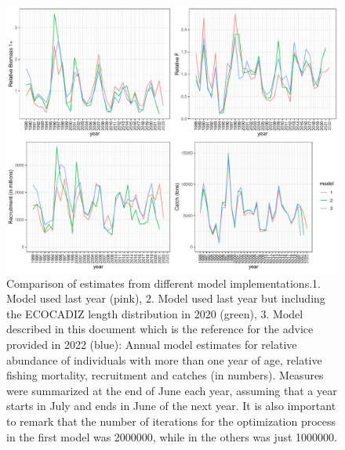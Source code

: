 \documentclass[review]{elsarticle}
\begin{document}
\begin{figure}[h!]
 \centering
 \includegraphics{./ICESplots_modelcomp.pdf}
 \caption{Comparison of estimates from different model implementations.1. Model used last year (pink), 2. Model used last year but including the ECOCADIZ length distribution in 2020 (green), 3. Model described in this document which is the reference for the advice provided in 2022 (blue): Annual model estimates for relative abundance of individuals with more than one year of age, relative fishing mortality, recruitment and catches (in numbers). Measures were summarized at the end of June each year, assuming that a year starts in July and ends in June of the next year. It is also important to remark that the number of iterations for the optimization process in the first model was 2000000, while in the others was just 1000000.}
 \label{modelcomp}
\end{figure}
% 
\end{document}
